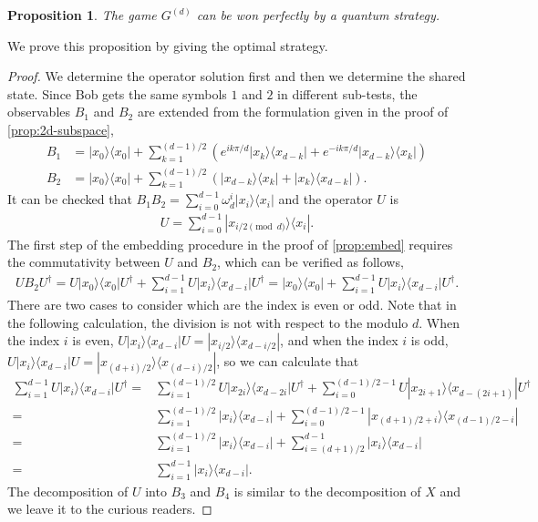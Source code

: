 \documentclass[11pt,letterpaper]{article}
\newcommand{\ketbra}[2]{|#1\rangle\langle#2|}
\newcommand{\ct}{^{\dagger}}
\newcommand{\1}{\mathbb{1}}
\newcommand{\G}[1]{G^{(#1)}}
\newtheorem{proposition}[theorem]{Proposition}
\theoremstyle{definition}
\begin{document}
\begin{proposition}
	The game $\G{d}$ can be won perfectly by a quantum strategy.
\end{proposition}
We prove this proposition by giving the optimal strategy.
\begin{proof}
We determine the operator solution first and then we determine the shared state.
Since Bob gets the same symbols $1$ and $2$ in different sub-tests, 
the observables $B_1$ and $B_2$ are extended from the formulation given in the proof
of \cref{prop:2d-subspace},
\begin{align}
	B_1 &= \ketbra{x_0}{x_0} + 
	\sum_{k=1}^{(d-1)/2}\left( e^{ik\pi/d}\ketbra{x_k}{x_{d-k}} + e^{-ik\pi/d}\ketbra{x_{d-k}}{x_k}\right)\\
	B_2 &= \ketbra{x_0}{x_0} + 
	\sum_{k=1}^{(d-1)/2}\left(\ketbra{x_{d-k}}{x_k} + \ketbra{x_k}{x_{d-k}}\right).
\end{align}
It can be checked that $B_1B_2 = \sum_{i=0}^{d-1} \omega_d^i \ketbra{x_i}{x_i}$ and the operator $U$ is
\begin{align}
	U = \sum_{i=0}^{d-1} \ketbra{x_{i/2 \pmod{d}}}{x_i}.
\end{align}
The first step of the embedding procedure in the proof of \cref{prop:embed} requires
the commutativity between $U$ and $B_2$, which can be verified as follows,
\begin{align}
	UB_2U\ct = U\ketbra{x_0}{x_0}U\ct + \sum_{i=1}^{d-1} U\ketbra{x_i}{x_{d-i}}U\ct 
	= \ketbra{x_0}{x_0} + \sum_{i=1}^{d-1} U\ketbra{x_i}{x_{d-i}}U\ct.
\end{align}
There are two cases to consider which are the index is even or odd.
Note that in the following calculation, the division is not with respect to the modulo $d$.
When the index $i$ is even, $U\ketbra{x_i}{x_{d-i}}U = \ketbra{x_{i/2}}{x_{d-i/2}}$, and
when the index $i$ is odd, $U\ketbra{x_i}{x_{d-i}}U = \ketbra{x_{(d+i)/2}}{x_{(d-i)/2}}$,
so we can calculate that 
\begin{align}
	\sum_{i=1}^{d-1} U\ketbra{x_i}{x_{d-i}}U\ct 
	=& \sum_{i=1}^{(d-1)/2}U\ketbra{x_{2i}}{x_{d-2i}}U\ct 
	+ \sum_{i=0}^{(d-1)/2-1} U\ketbra{x_{2i+1}}{x_{d-(2i+1)}}U\ct\\
	=& \sum_{i=1}^{(d-1)/2}\ketbra{x_i}{x_{d-i}} + \sum_{i=0}^{(d-1)/2-1} \ketbra{x_{(d+1)/2+i}}{x_{(d-1)/2-i}}\\
	=& \sum_{i=1}^{(d-1)/2}\ketbra{x_i}{x_{d-i}} + \sum_{i=(d+1)/2}^{d-1} \ketbra{x_i}{x_{d-i}}\\
	=&\sum_{i=1}^{d-1} \ketbra{x_i}{x_{d-i}}.
\end{align}
The decomposition of $U$ into $B_3$ and $B_4$ is similar to the decomposition of $X$ and we leave it to the curious 
readers.


\end{proof}
\end{document}
